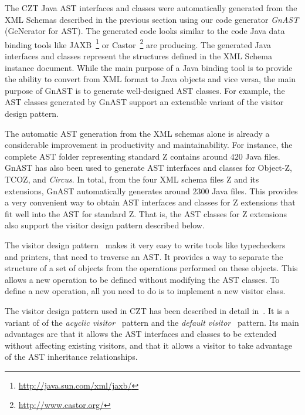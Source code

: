 \documentclass{llncs}
\newcommand{\Circus}{{\sf\slshape Circus}}
\begin{document}
  The CZT Java AST interfaces and classes were automatically generated
  from the XML Schemas described in the previous section using our
  code generator \emph{GnAST} (GeNerator for AST).  The generated code
  looks similar to the code Java data binding tools like
  JAXB~\footnote{\url{http://java.sun.com/xml/jaxb/}} or
  Castor~\footnote{\url{http://www.castor.org/}} are producing.  The
  generated Java interfaces and classes represent the structures
  defined in the XML Schema instance document.  While the main purpose
  of a Java binding tool is to provide the ability to convert from XML
  format to Java objects and vice versa, the main purpose of GnAST is
  to generate well-designed AST classes.  For example, the AST classes
  generated by GnAST support an extensible variant of the visitor
  design pattern.

  The automatic AST generation from the XML schemas alone is already a
  considerable improvement in productivity and maintainability.  For
  instance, the complete AST folder representing standard Z contains
  around $420$ Java files.  GnAST has also been used to generate AST
  interfaces and classes for Object-Z, TCOZ, and \Circus.  In total,
  from the four XML schema files Z and its extensions, GnAST
  automatically generates around $2300$ Java files.  This provides a
  very convenient way to obtain AST interfaces and classes for Z
  extensions that fit well into the AST for standard Z.  That is, the
  AST classes for Z extensions also support the visitor design pattern
  described below.

  The visitor design pattern~\cite{GamEA:95,MaiCha:01} makes it very
  easy to write tools like typecheckers and printers, that need to
  traverse an AST.  It provides a way to separate the structure of a
  set of objects from the operations performed on these objects.  This
  allows a new operation to be defined without modifying the AST
  classes.  To define a new operation, all you need to do is to
  implement a new visitor class.

  The visitor design pattern used in CZT has been described in detail
  in~\cite{czt}.  It is a variant of of the \emph{acyclic
  visitor}~\cite{Mar:97} pattern and the \emph{default
  visitor}~\cite{Nor:97} pattern.  Its main advantages are that it
  allows the AST interfaces and classes to be extended without
  affecting existing visitors, and that it allows a visitor to take
  advantage of the AST inheritance relationships.
\end{document}
